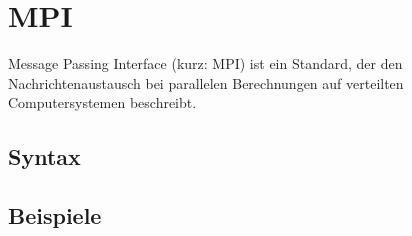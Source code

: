 \chapter{MPI}

Message Passing Interface (kurz: MPI) ist ein Standard, 
der den Nachrichtenaustausch bei parallelen Berechnungen auf 
verteilten Computersystemen beschreibt.

\section{Syntax}
\section{Beispiele}



